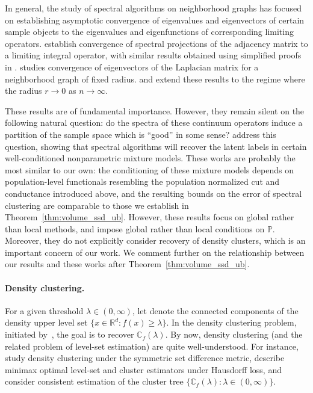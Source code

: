 \documentclass[11pt,twoside]{article}
\newcommand{\Reals}{\mathbb{R}}
\newcommand{\1}{\mathbf{1}}
\newcommand{\Rd}{\Reals^d}
\newcommand{\Pbb}{\mathbb{P}}
\begin{document}
In general, the study of spectral algorithms on neighborhood graphs has
focused on establishing asymptotic convergence of eigenvalues and eigenvectors
of certain sample objects to the eigenvalues and eigenfunctions of corresponding
limiting operators. \citet{koltchinskii2000} establish convergence of spectral
projections of the adjacency matrix to a limiting integral operator, with
similar results obtained using simplified proofs in
\citet{rosasco10}. \citet{vonluxburg2008} studies convergence of eigenvectors of
the Laplacian matrix for a neighborhood graph of fixed radius. \citet{belkin07} and
\citet{garciatrillos18} extend these results to the regime where the radius $r
\to 0$ as $n \to \infty$. 

These results are of fundamental importance. However, they remain silent on the following natural question: do the spectra of these continuum operators induce a partition of the sample space which is ``good'' in some sense? \citet{shi2009,schiebinger2015,garciatrillos19,hoffmann2019} address this question, showing that spectral algorithms will recover the latent labels in certain well-conditioned nonparametric mixture models. These works are probably the most similar to our own: the conditioning of these mixture models depends on population-level functionals resembling the population normalized cut and conductance introduced above, and the resulting bounds on the error of spectral clustering are comparable to those we establish in Theorem~\ref{thm:volume_ssd_ub}. However, these results focus on global rather than local methods, and impose global rather than local conditions on $\Pbb$. Moreover, they do not explicitly consider recovery of density clusters, which is an important concern of our work. We comment further on the relationship between our results and these works after Theorem~\ref{thm:volume_ssd_ub}.

\paragraph{Density clustering.} For a given threshold $\lambda \in (0,\infty)$, let  denote the connected components of the density upper level set $\{x \in \Rd: f(x) \geq \lambda\}$. In the density clustering problem, initiated by~\cite{hartigan1975}, the goal is to recover $\mathbb{C}_{f}(\lambda)$. By now, density clustering (and the related problem of level-set estimation) are quite well-understood. For instance, \citet{polonik1995,rigollet2009, rinaldo2010, steinwart2015} study density clustering under the symmetric set difference
metric, \citet{tsybakov1997,singh2009,jiang2017} describe minimax optimal level-set and cluster estimators under Hausdorff loss, and
\citet{hartigan1981,chaudhuri2010,kpotufe11,balakrishnan2013,steinwart2017,wang2019} consider
consistent estimation of the cluster tree $\{\mathbb{C}_f(\lambda): \lambda \in (0,\infty)\}$.
\end{document}
